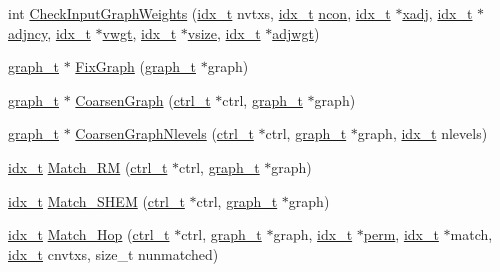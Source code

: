 \begin{DoxyCompactItemize}
int \hyperlink{a00945_aeafd137b3625206526f200a7d8a8c3df}{Check\+Input\+Graph\+Weights} (\hyperlink{a00876_aaa5262be3e700770163401acb0150f52}{idx\+\_\+t} nvtxs, \hyperlink{a00876_aaa5262be3e700770163401acb0150f52}{idx\+\_\+t} \hyperlink{a00879_ac1dd31740e8f97fb57dc917ded30253f}{ncon}, \hyperlink{a00876_aaa5262be3e700770163401acb0150f52}{idx\+\_\+t} $\ast$\hyperlink{a00879_aa8fc7f75458e38e1e2979ed6db639164}{xadj}, \hyperlink{a00876_aaa5262be3e700770163401acb0150f52}{idx\+\_\+t} $\ast$\hyperlink{a00879_a20c068e3ebdd8f9889fb82c1f677d679}{adjncy}, \hyperlink{a00876_aaa5262be3e700770163401acb0150f52}{idx\+\_\+t} $\ast$\hyperlink{a00879_a34203f1160d94eca83e95f2718ea3504}{vwgt}, \hyperlink{a00876_aaa5262be3e700770163401acb0150f52}{idx\+\_\+t} $\ast$\hyperlink{a00879_aac32df5bb22250d94fc2fc7e4078308b}{vsize}, \hyperlink{a00876_aaa5262be3e700770163401acb0150f52}{idx\+\_\+t} $\ast$\hyperlink{a00879_a2be4719baa820cfa5c06fd070796e0d3}{adjwgt})
\item 
\hyperlink{a00734}{graph\+\_\+t} $\ast$ \hyperlink{a00945_a681b2f4a615da39347c928c127760d07}{Fix\+Graph} (\hyperlink{a00734}{graph\+\_\+t} $\ast$graph)
\item 
\hyperlink{a00734}{graph\+\_\+t} $\ast$ \hyperlink{a00945_adeb2c7c9bffbeca00fcc97854fb88ada}{Coarsen\+Graph} (\hyperlink{a00742}{ctrl\+\_\+t} $\ast$ctrl, \hyperlink{a00734}{graph\+\_\+t} $\ast$graph)
\item 
\hyperlink{a00734}{graph\+\_\+t} $\ast$ \hyperlink{a00945_afa83320e3b311e0feef90d0bf4303716}{Coarsen\+Graph\+Nlevels} (\hyperlink{a00742}{ctrl\+\_\+t} $\ast$ctrl, \hyperlink{a00734}{graph\+\_\+t} $\ast$graph, \hyperlink{a00876_aaa5262be3e700770163401acb0150f52}{idx\+\_\+t} nlevels)
\item 
\hyperlink{a00876_aaa5262be3e700770163401acb0150f52}{idx\+\_\+t} \hyperlink{a00945_a892d2ea16d613abc2276ad5fc6999724}{Match\+\_\+\+RM} (\hyperlink{a00742}{ctrl\+\_\+t} $\ast$ctrl, \hyperlink{a00734}{graph\+\_\+t} $\ast$graph)
\item 
\hyperlink{a00876_aaa5262be3e700770163401acb0150f52}{idx\+\_\+t} \hyperlink{a00945_af3ec72f3170ccdca06d8ad018d86cc58}{Match\+\_\+\+S\+H\+EM} (\hyperlink{a00742}{ctrl\+\_\+t} $\ast$ctrl, \hyperlink{a00734}{graph\+\_\+t} $\ast$graph)
\item 
\hyperlink{a00876_aaa5262be3e700770163401acb0150f52}{idx\+\_\+t} \hyperlink{a00945_aead846b2c69509c914426ff087509934}{Match\+\_\+Hop} (\hyperlink{a00742}{ctrl\+\_\+t} $\ast$ctrl, \hyperlink{a00734}{graph\+\_\+t} $\ast$graph, \hyperlink{a00876_aaa5262be3e700770163401acb0150f52}{idx\+\_\+t} $\ast$\hyperlink{a00879_ab96e9eb84fc7c342d17690a1341645dd}{perm}, \hyperlink{a00876_aaa5262be3e700770163401acb0150f52}{idx\+\_\+t} $\ast$match, \hyperlink{a00876_aaa5262be3e700770163401acb0150f52}{idx\+\_\+t} cnvtxs, size\+\_\+t nunmatched)

\end{DoxyCompactItemize}
